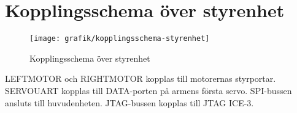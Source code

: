 \section{Kopplingsschema över styrenhet}

\begin{figure}[h]
\center
\texttt{[image: grafik/kopplingsschema-styrenhet]}
\caption{Kopplingsschema över styrenhet}
\end{figure}

LEFTMOTOR och RIGHTMOTOR kopplas till motorernas styrportar. SERVOUART kopplas till DATA-porten på armens första servo. SPI-bussen ansluts till huvudenheten. JTAG-bussen kopplas till JTAG ICE-3.
